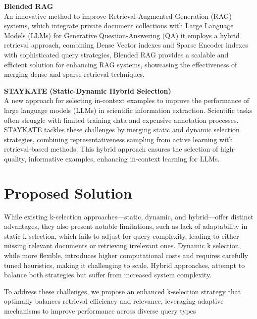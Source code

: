 \textbf{Blended RAG} \\
An innovative method to improve Retrieval-Augmented Generation (RAG) systems, which integrate private document collections with Large Language Models (LLMs) for Generative Question-Answering (QA) it employs a hybrid retrieval approach, combining Dense Vector indexes and Sparse Encoder indexes with sophisticated query strategies, Blended RAG provides a scalable and efficient solution for enhancing RAG systems, showcasing the effectiveness of merging dense and sparse retrieval techniques\cite{sawarkar2024blendedragimprovingrag}.

\textbf{ STAYKATE (Static-Dynamic Hybrid Selection)} \\
A new approach for selecting in-context examples to improve the performance of large language models (LLMs) in scientific information extraction. Scientific tasks often struggle with limited training data and expensive annotation processes. STAYKATE tackles these challenges by merging static and dynamic selection strategies, combining representativeness sampling from active learning with retrieval-based methods. This hybrid approach ensures the selection of high-quality, informative examples, enhancing in-context learning for LLMs\cite{zhu2024staykatehybridincontextexample}.
\section{ Proposed Solution}
While existing k-selection approaches—static, dynamic, and hybrid—offer distinct advantages, they also present notable limitations, such as lack of adaptability in static k selection, which fails to adjust for query complexity, leading to either missing relevant documents or retrieving irrelevant ones. Dynamic k selection, while more flexible, introduces higher computational costs and requires carefully tuned heuristics, making it challenging to scale. Hybrid approaches, attempt to balance both strategies but suffer from increased system complexity.

To address these challenges, we propose an enhanced k-selection strategy that optimally balances retrieval efficiency and relevance, leveraging adaptive mechanisms to improve performance across diverse query types
